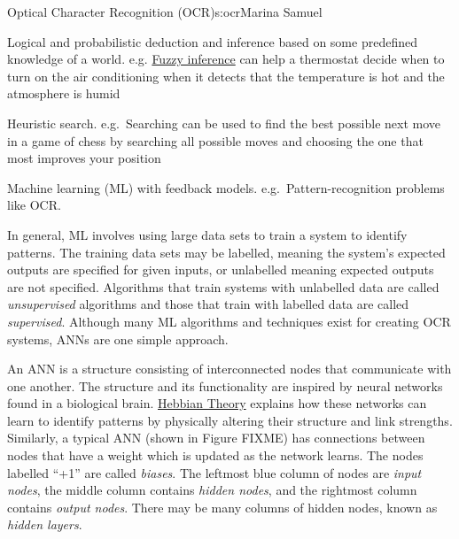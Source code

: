 \begin{aosachapter}{Optical Character Recognition (OCR)}{s:ocr}{Marina Samuel}
\begin{aosaitemize}

\item
  Logical and probabilistic deduction and inference based on some
  predefined knowledge of a world. e.g.
  \href{http://www.cs.princeton.edu/courses/archive/fall07/cos436/HIDDEN/Knapp/fuzzy004.htm}{Fuzzy
  inference} can help a thermostat decide when to turn on the air
  conditioning when it detects that the temperature is hot and the
  atmosphere is humid
\item
  Heuristic search. e.g.~Searching can be used to find the best possible
  next move in a game of chess by searching all possible moves and
  choosing the one that most improves your position
\item
  Machine learning (ML) with feedback models. e.g.~Pattern-recognition
  problems like OCR.
\end{aosaitemize}

In general, ML involves using large data sets to train a system to
identify patterns. The training data sets may be labelled, meaning the
system's expected outputs are specified for given inputs, or unlabelled
meaning expected outputs are not specified. Algorithms that train
systems with unlabelled data are called \emph{unsupervised} algorithms
and those that train with labelled data are called \emph{supervised}.
Although many ML algorithms and techniques exist for creating OCR
systems, ANNs are one simple approach.

\label{artificial-neural-networks}

\label{what-are-anns}

\label{sec.ocr.ann}

An ANN is a structure consisting of interconnected nodes that
communicate with one another. The structure and its functionality are
inspired by neural networks found in a biological brain.
\href{http://www.nbb.cornell.edu/neurobio/linster/BioNB420/hebb.pdf}{Hebbian
Theory} explains how these networks can learn to identify patterns by
physically altering their structure and link strengths. Similarly, a
typical ANN (shown in Figure FIXME) has connections between nodes that
have a weight which is updated as the network learns. The nodes labelled
``+1'' are called \emph{biases}. The leftmost blue column of nodes are
\emph{input nodes}, the middle column contains \emph{hidden nodes}, and
the rightmost column contains \emph{output nodes}. There may be many
columns of hidden nodes, known as \emph{hidden layers}.


\end{aosachapter}
